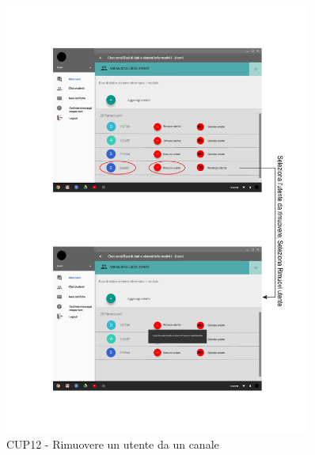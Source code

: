\begin{figure}
	\centering
	\includegraphics[width=0.9\textwidth]{imgs/gruppo6/activities/act_cup12_cancella_utente_canale.pdf}
	\caption{CUP12 - Rimuovere un utente da un canale}
	\label{fig:cup12}
\end{figure}

